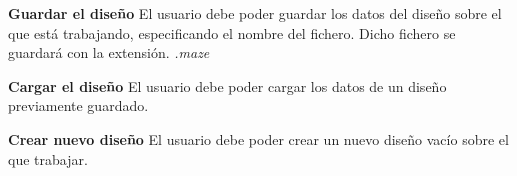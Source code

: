 	\item \textbf{Guardar el diseño}\newline
		El usuario debe poder guardar los datos del diseño sobre el que está trabajando, especificando el nombre del fichero. Dicho fichero se guardará con la extensión. \textit{.maze}
	\item \textbf{Cargar el diseño}\newline
		El usuario debe poder cargar los datos de un diseño previamente guardado.
	\item \textbf{Crear nuevo diseño}\newline
		El usuario debe poder crear un nuevo diseño vacío sobre el que trabajar.
